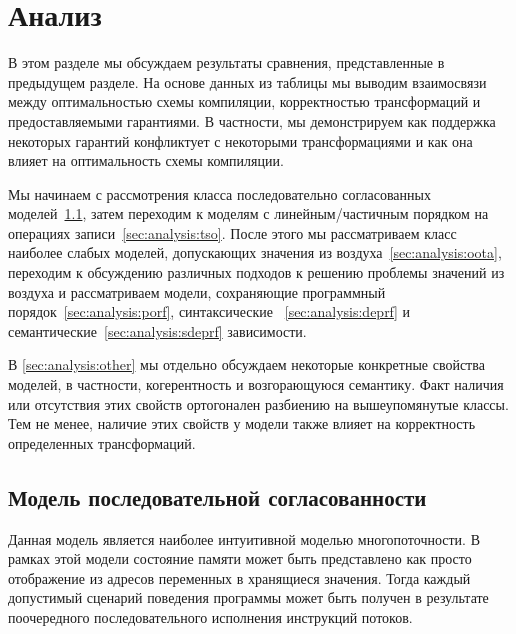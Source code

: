 \section{Анализ}
\label{sec:analysis}


В этом разделе мы обсуждаем результаты сравнения, представленные в предыдущем разделе.
На основе данных из таблицы мы выводим взаимосвязи между оптимальностью схемы компиляции,
корректностью трансформаций и предоставляемыми гарантиями. 
В частности, мы демонстрируем как поддержка 
некоторых гарантий конфликтует с некоторыми трансформациями 
и как она влияет на оптимальность схемы компиляции. 

Мы начинаем с рассмотрения класса 
последовательно согласованных моделей~\cref{sec:analysis:seqcst},
затем  переходим к моделям с линейным/частичным порядком на операциях записи~\cref{sec:analysis:tso}.
После этого мы рассматриваем класс наиболее слабых моделей, 
допускающих значения из воздуха~\cref{sec:analysis:oota}, 
 переходим к обсуждению различных подходов 
к решению проблемы значений из воздуха и рассматриваем модели, 
сохраняющие программный порядок~\cref{sec:analysis:porf},
синтаксические ~\cref{sec:analysis:deprf} и
семантические~\cref{sec:analysis:sdeprf} зависимости.
 
В \cref{sec:analysis:other} мы отдельно обсуждаем некоторые 
конкретные свойства моделей, в частности, когерентность и возгорающуюся семантику. 
Факт наличия или отсутствия этих свойств ортогонален
разбиению на вышеупомянутые классы. 
Тем не менее, наличие этих свойств у модели также влияет 
на корректность определенных трансформаций.

\subsection{Модель последовательной согласованности}
\label{sec:analysis:seqcst}

Данная модель является наиболее интуитивной моделью многопоточности.
В рамках этой модели состояние памяти может быть 
представлено как просто отображение из 
адресов переменных в хранящиеся значения. 
Тогда каждый допустимый сценарий поведения программы 
может быть получен в результате поочередного последовательного
исполнения инструкций потоков. 


